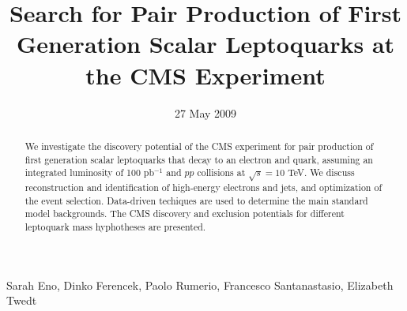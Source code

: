 
%
\begin{titlepage}

   \date{27 May 2009}


  \title{Search for Pair Production of First Generation Scalar Leptoquarks at the CMS Experiment}

  \begin{Authlist}
   Sarah Eno, Dinko Ferencek, Paolo Rumerio, Francesco Santanastasio, Elizabeth Twedt
  \end{Authlist}


  \begin{abstract}
    We investigate the discovery potential of the CMS experiment
    for pair production of first generation scalar leptoquarks that 
    decay to an electron and quark, assuming 
    an integrated luminosity of 100 pb$^{-1}$ and $pp$ collisions 
    at $\sqrt{s}=10$ TeV.
    We discuss 
    reconstruction and identification of high-energy electrons and jets, 
    and optimization of the event selection.
    Data-driven techiques are used to determine 
the main standard model backgrounds. 
The CMS discovery and exclusion potentials for different leptoquark 
mass hyphotheses are presented.



%
  \end{abstract} 

\end{titlepage}


